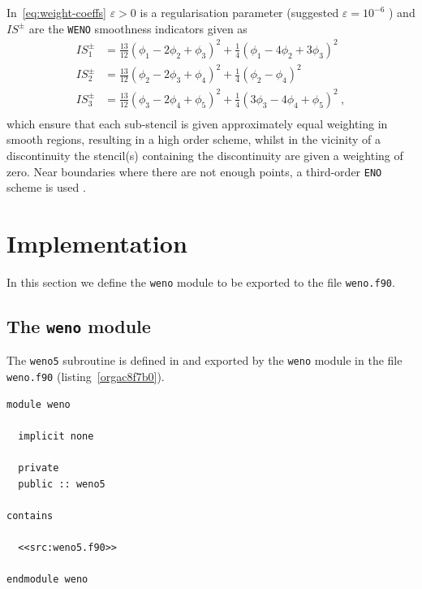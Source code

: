 \documentclass[11pt]{article}
\begin{document}
In~\eqref{eq:weight-coeffs} \(\varepsilon>0\) is a regularisation parameter (suggested \(\varepsilon=10^{-6}\)
\cite{Jiang1996,Croce2004}) and \(IS^{\pm}\) are the \texttt{WENO} smoothness indicators given as \cite{Jiang1996}
\begin{equation}
  \label{eq:smoothness-indicators}
  \begin{split}
    IS^{\pm}_1 &= \frac{13}{12} {\left( \phi_1 - 2\phi_2 + \phi_3 \right)}^2 + \frac{1}{4}
    {\left( \phi_1 - 4\phi_2 + 3\phi_3 \right)}^2\, \\
    IS^{\pm}_2 &= \frac{13}{12} {\left( \phi_2 - 2\phi_3 + \phi_4 \right)}^2 + \frac{1}{4}
    {\left( \phi_2 - \phi_4 \right)}^2\, \\
    IS^{\pm}_3 &= \frac{13}{12} {\left( \phi_3 - 2\phi_4 + \phi_5 \right)}^2 + \frac{1}{4}
    {\left( 3\phi_3 - 4\phi_4 + \phi_5 \right)}^2\ , \\
  \end{split}
\end{equation}
which ensure that each sub-stencil is given approximately equal weighting in smooth regions,
resulting in a high order scheme, whilst in the vicinity of a discontinuity the stencil(s)
containing the discontinuity are given a weighting of zero.
Near boundaries where there are not enough points, a third-order \texttt{ENO} scheme is used \cite{Croce2004}.

\section{Implementation}
\label{sec:org7a92d30}

In this section we define the \texttt{weno} module to be exported to the file \texttt{weno.f90}.

\subsection{The \texttt{weno} module}
\label{sec:orga92f4b1}

The \texttt{weno5} subroutine is defined in and exported by the \texttt{weno} module in the file \texttt{weno.f90}
(listing~\ref{orgac8f7b0}).

\begin{lstlisting}
module weno

  implicit none

  private
  public :: weno5

contains

  <<src:weno5.f90>>

endmodule weno
\end{lstlisting}
\end{document}
